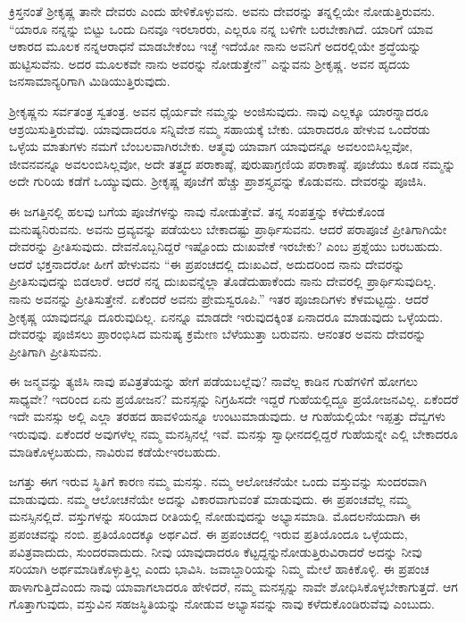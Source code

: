 ಕ್ರಿಸ್ತನಂತೆ ಶ‍್ರೀಕೃಷ್ಣ ತಾನೇ ದೇವರು ಎಂದು ಹೇಳಿಕೊಳ್ಳುವನು. ಅವನು ದೇವರನ್ನು ತನ್ನಲ್ಲಿಯೇ ನೋಡುತ್ತಿರುವನು. “ಯಾರೂ ನನ್ನನ್ನು ಬಿಟ್ಟು ಒಂದು ದಿನವೂ ಇರ\-ಲಾರರು, ಎಲ್ಲರೂ ನನ್ನ ಬಳಿಗೇ ಬರಬೇಕಾಗಿದೆ. ಯಾರಿಗೆ ಯಾವ ಆಕಾರದ ಮೂಲಕ ನನ್ನ\break ಆರಾಧನೆ ಮಾಡಬೇಕೆಂಬ ಇಚ್ಛೆ ಇದೆಯೋ ನಾನು ಅವನಿಗೆ ಅದರಲ್ಲಿಯೇ ಶ್ರದ್ಧೆಯನ್ನು ಹುಟ್ಟಿಸುವೆನು. ಅದರ ಮೂಲಕವೇ ನಾನು ಅವರನ್ನು ನೋಡುತ್ತೇನೆ” ಎನ್ನುವನು ಶ‍್ರೀಕೃಷ್ಣ. ಅವನ ಹೃದಯ ಜನಸಾಮಾನ್ಯರಿಗಾಗಿ ಮಿಡಿಯುತ್ತಿರುವುದು.

ಶ‍್ರೀಕೃಷ್ಣನು ಸರ್ವತಂತ್ರ ಸ್ವತಂತ್ರ. ಅವನ ಧೈರ್ಯವೇ ನಮ್ಮನ್ನು ಅಂಜಿಸುವುದು. ನಾವು ಎಲ್ಲಕ್ಕೂ ಯಾರನ್ನಾದರೂ ಆಶ್ರಯಿಸುತ್ತಿರುವೆವು. ಯಾವುದಾದರೂ ಸನ್ನಿವೇಶ ನಮ್ಮ ಸಹಾಯಕ್ಕೆ ಬೇಕು. ಯಾರಾದರೂ ಹೇಳುವ ಒಂದೆರಡು ಒಳ್ಳೆಯ ಮಾತುಗಳು ನಮಗೆ ಬೆಂಬಲವಾಗಿರಬೇಕು. ಆತ್ಮವು ಯಾವಾಗ ಯಾವುದನ್ನೂ ಅವಲಂಬಿಸಿಲ್ಲವೋ, ಜೀವನವನ್ನೂ ಅವಲಂಬಿಸಿಲ್ಲವೋ, ಅದೇ ತತ್ತ್ವದ ಪರಾಕಾಷ್ಠೆ, ಪುರುಷಾಗ್ರಣಿಯ ಪರಾಕಾಷ್ಠೆ. ಪೂಜೆಯು ಕೂಡ ನಮ್ಮನ್ನು ಅದೇ ಗುರಿಯ ಕಡೆಗೆ ಒಯ್ಯುವುದು. ಶ‍್ರೀಕೃಷ್ಣ ಪೂಜೆಗೆ ಹೆಚ್ಚು ಪ್ರಾಶಸ್ತ್ಯವನ್ನು ಕೊಡುವನು. ದೇವರನ್ನು ಪೂಜಿಸಿ.

ಈ ಜಗತ್ತಿನಲ್ಲಿ ಹಲವು ಬಗೆಯ ಪೂಜೆಗಳನ್ನು ನಾವು ನೋಡುತ್ತೇವೆ. ತನ್ನ ಸಂಪತ್ತನ್ನು ಕಳೆದುಕೊಂಡ ಮನುಷ್ಯನಿರುವನು. ಅವನು ದ್ರವ್ಯವನ್ನು ಪಡೆಯಲು ಬೇಕಾದಷ್ಟು ಪ್ರಾರ್ಥಿಸುವನು. ಆದರೆ ಪರಾಪೂಜೆ ಪ್ರೀತಿಗಾಗಿಯೇ ದೇವರನ್ನು ಪ್ರೀತಿಸುವುದು. ದೇವನೊಬ್ಬನಿದ್ದರೆ ಇಷ್ಟೊಂದು ದುಃಖವೇಕೆ ಇರಬೇಕು? ಎಂಬ ಪ್ರಶ್ನೆಯು ಬರಬಹುದು. ಆದರೆ ಭಕ್ತನಾದರೋ ಹೀಗೆ ಹೇಳುವನು “ಈ ಪ್ರಪಂಚದಲ್ಲಿ ದುಃಖವಿದೆ, ಅದುದರಿಂದ ನಾನು ದೇವರನ್ನು ಪ್ರೀತಿಸುವುದನ್ನು ಬಿಡಲಾರೆ. ಆದರೆ ನನ್ನ ದುಃಖವನ್ನೆಲ್ಲಾ ತೊಡೆದುಹಾಕೆಂದು ನಾನು ದೇವರಲ್ಲಿ ಪ್ರಾರ್ಥಿಸುವುದಿಲ್ಲ. ನಾನು ಅವನನ್ನು ಪ್ರೀತಿಸುತ್ತೇನೆ. ಏಕೆಂದರೆ ಅವನು ಪ್ರೇಮಸ್ವರೂಪಿ.” ಇತರ ಪೂಜಾದಿಗಳು ಕೆಳಮಟ್ಟದ್ದು. ಆದರೆ ಶ‍್ರೀಕೃಷ್ಣ ಯಾವುದನ್ನೂ ದೂರುವುದಿಲ್ಲ. ಏನನ್ನೂ ಮಾಡದೇ ಇರುವುದಕ್ಕಿಂತ ಏನಾದರೂ ಮಾಡುವುದು ಒಳ್ಳೆಯದು. ದೇವರನ್ನು ಪೂಜಿಸಲು ಪ್ರಾರಂಭಿಸಿದ ಮನುಷ್ಯ ಕ್ರಮೇಣ ಬೆಳೆಯುತ್ತಾ ಬರುವನು. ಆನಂತರ ಅವನು ದೇವರನ್ನು ಪ್ರೀತಿಗಾಗಿ ಪ್ರೀತಿಸುವನು.

ಈ ಜನ್ಮವನ್ನು ತ್ಯಜಿಸಿ ನಾವು ಪವಿತ್ರತೆಯನ್ನು ಹೇಗೆ ಪಡೆಯಬಲ್ಲೆವು? ನಾವೆಲ್ಲ ಕಾಡಿನ ಗುಹೆಗಳಿಗೆ ಹೋಗಲು ಸಾಧ್ಯವೇ? ಇದರಿಂದ ಏನು ಪ್ರಯೋಜನ? ಮನಸ್ಸನ್ನು ನಿಗ್ರಹಿಸದೇ ಇದ್ದರೆ ಗುಹೆಯಲ್ಲಿದ್ದೂ ಪ್ರಯೋಜನವಿಲ್ಲ. ಏಕೆಂದರೆ ಇದೇ ಮನಸ್ಸು ಅಲ್ಲಿ ಎಲ್ಲಾ ತರಹದ ಹಾವಳಿಯನ್ನೂ ಉಂಟುಮಾಡುವುದು. ಆ ಗುಹೆಯಲ್ಲಿಯೇ ಇಪ್ಪತ್ತು ದೆವ್ವಗಳು ಇರುವುವು. ಏಕೆಂದರೆ ಅವುಗಳೆಲ್ಲ ನಮ್ಮ ಮನಸ್ಸಿನಲ್ಲೆ ಇವೆ. ಮನಸ್ಸು ಸ್ವಾಧೀನದಲ್ಲಿದ್ದರೆ ಗುಹೆಯನ್ನೇ ಎಲ್ಲಿ ಬೇಕಾದರೂ ಮಾಡಿಕೊಳ್ಳಬಹುದು, ನಾವಿರುವ ಕಡೆಯೇ\break ಇರಬಹುದು.

ಜಗತ್ತು ಈಗ ಇರುವ ಸ್ಥಿತಿಗೆ ಕಾರಣ ನಮ್ಮ ಮನಸ್ಸು. ನಮ್ಮ ಆಲೋಚನೆಯೇ ಒಂದು ವಸ್ತುವನ್ನು ಸುಂದರವಾಗಿ ಮಾಡುವುದು. ನಮ್ಮ ಆಲೋಚನೆಯೇ ಅದನ್ನು ವಿಕಾರವಾಗುವಂತೆ ಮಾಡುವುದು. ಈ ಪ್ರಪಂಚವೆಲ್ಲ ನಮ್ಮ ಮನಸ್ಸಿನಲ್ಲಿದೆ. ವಸ್ತುಗಳನ್ನು ಸರಿಯಾದ ರೀತಿಯಲ್ಲಿ ನೋಡುವುದನ್ನು ಅಭ್ಯಾಸಮಾಡಿ. ಮೊದಲನೆಯದಾಗಿ ಈ ಪ್ರಪಂಚವನ್ನು ನಂಬಿ. ಪ್ರತಿಯೊಂದಕ್ಕೂ ಅರ್ಥವಿದೆ. ಈ ಪ್ರಪಂಚದಲ್ಲಿ ಇರುವ ಪ್ರತಿಯೊಂದೂ ಒಳ್ಳೆಯದು, ಪವಿತ್ರವಾದುದು, ಸುಂದರವಾದುದು. ನೀವು ಯಾವುದಾದರೂ ಕೆಟ್ಟದ್ದನ್ನು\break ನೋಡುತ್ತಿರುವಿರಾದರೆ ಅದನ್ನು ನೀವು ಸರಿಯಾಗಿ ಅರ್ಥಮಾಡಿಕೊಳ್ಳುತ್ತಿಲ್ಲ ಎಂದು ಭಾವಿಸಿ. ಜವಾಬ್ದಾರಿಯನ್ನು ನಿಮ್ಮ ಮೇಲೆ ಹಾಕಿಕೊಳ್ಳಿ. ಈ ಪ್ರಪಂಚ ಹಾಳಾಗುತ್ತಿದೆ\break ಎಂದು ನಾವು ಯಾವಾಗಲಾದರೂ ಹೇಳಿದರೆ, ನಮ್ಮ ಮನಸ್ಸನ್ನು ನಾವೇ ಶೋಧಿಸಿಕೊಳ್ಳಬೇಕಾಗುತ್ತದೆ. ಆಗ ಗೊತ್ತಾಗುವುದು, ವಸ್ತುವಿನ ಸಹಜಸ್ಥಿತಿಯನ್ನು ನೋಡುವ ಅಭ್ಯಾಸವನ್ನು ನಾವು ಕಳೆದುಕೊಂಡಿರುವೆವು ಎಂಬುದು.

